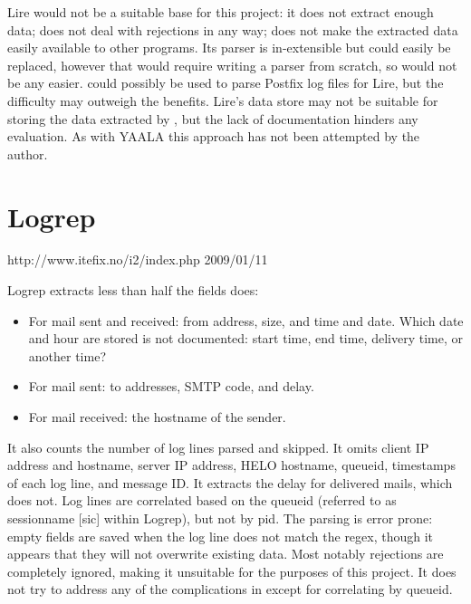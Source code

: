Lire would not be a suitable base for this project: it does not extract
enough data; does not deal with rejections in any way; does not make the
extracted data easily available to other programs.  Its parser is
in-extensible but could easily be replaced, however that would require
writing a parser from scratch, so would not be any easier.  \parsername{}
could possibly be used to parse Postfix log files for Lire, but the
difficulty may outweigh the benefits.  Lire's data store may not be
suitable for storing the data extracted by \parsername{}, but the lack of
documentation hinders any evaluation.  As with YAALA this approach has not
been attempted by the author.

\section{Logrep}

{http://www.itefix.no/i2/index.php}
{2009/01/11}

Logrep extracts less than half the fields \parsername{} does:

\begin{itemize}

    \item For mail sent and received: from address, size, and time and
        date.  Which date and hour are stored is not documented: start
        time, end time, delivery time, or another time?

    \item For mail sent: to addresses, \gls{SMTP} code, and delay.

    \item For mail received: the hostname of the sender.

\end{itemize}

It also counts the number of log lines parsed and skipped.  It omits client
\gls{IP} address and hostname, server \gls{IP} address, HELO hostname,
queueid, timestamps of each log line, and message ID\@.  It extracts the
delay for delivered mails, which \parsername{} does not.  Log lines are
correlated based on the queueid (referred to as sessionname [sic] within
Logrep), but not by \gls{pid}.  The parsing is error prone: empty fields
are saved when the log line does not match the regex, though it appears
that they will not overwrite existing data.  Most notably rejections are
completely ignored, making it unsuitable for the purposes of this project.
It does not try to address any of the complications in
 except for correlating by queueid.

